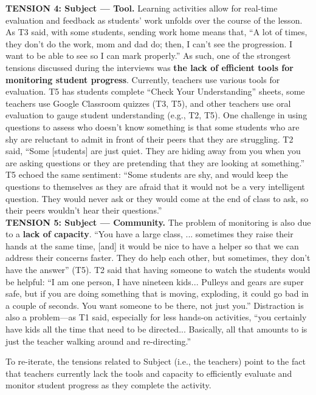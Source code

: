 \textbf{TENSION 4: Subject --- Tool.} Learning activities allow for real-time evaluation and feedback as students' work unfolds over the course of the lesson.  As T3 said, with some students, sending work home means that, ``A lot of times, they don't do the work, mom and dad do; then, I can't see the progression. I want to be able to see so I can mark properly.''  As such, one of the strongest tensions discussed during the interviews was \textbf{the lack of efficient tools for monitoring student progress}. Currently, teachers use various tools for evaluation.  T5 has students complete ``Check Your Understanding'' sheets, some teachers use Google Classroom quizzes (T3, T5), and other teachers use oral evaluation to gauge student understanding (e.g., T2, T5).  One challenge in using questions to assess who doesn't know something is that some students who are shy are reluctant to admit in front of their peers that they are struggling.  T2 said, ``Some [students] are just quiet.  They are hiding away from you when you are asking questions or they are pretending that they are looking at something.'' T5 echoed the same sentiment: ``Some students are shy, and would keep the questions to themselves as they are afraid that it would not be a very intelligent question.  They would never ask or they would come at the end of class to ask, so their peers wouldn't hear their questions.''   \\



\textbf{TENSION 5: Subject --- Community.} The problem of monitoring is also due to a \textbf{lack of capacity}. ``You have a large class, ... sometimes they raise their hands at the same time, [and] it would be nice to have a helper so that we can address their concerns faster.  They do help each other, but sometimes, they don't have the answer'' (T5).  T2 said that having someone to watch the students would be helpful: ``I am one person, I have nineteen kids... Pulleys and gears are super safe, but if you are doing something that is moving, exploding, it could go bad in a couple of seconds.  You want someone to be there, not just you.'' Distraction is also a problem---as T1 said, especially for less hands-on activities, ``you certainly have kids all the time that need to be directed... Basically, all that amounts to is just the teacher walking around and re-directing.''

To re-iterate, the tensions related to Subject (i.e., the teachers) point to the fact that teachers currently lack the tools and capacity to efficiently evaluate and monitor student progress as they complete the activity.

